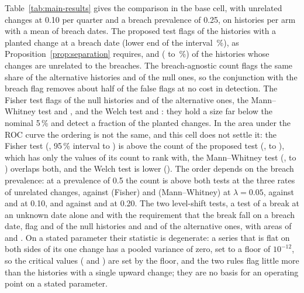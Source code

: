 Table~\ref{tab:main-results} gives the comparison in the base cell, with unrelated changes at 0.10 per quarter and a breach prevalence of 0.25, on \statedN{} histories per arm with a mean of \statedMeanM{} breach dates. The proposed test flags \statedAltEngine{} of the histories with a planted change at a breach date (lower end of the interval \statedAltLoEngine{}\,\%), as Proposition~\ref{prop:separation} requires, and \statedNullEngine{} (\statedNullLoEngine{} to \statedNullHiEngine{}\,\%) of the histories whose changes are unrelated to the breaches. The breach-agnostic count flags the same share of the alternative histories and \statedNullAny{} of the null ones, so the conjunction with the breach flag removes about half of the false flags at no cost in detection. The Fisher test flags \statedNullFisher{} of the null histories and \statedAltFisher{} of the alternative ones, the Mann--Whitney test \statedNullMw{} and \statedAltMw{}, and the Welch test \statedNullWelch{} and \statedAltWelch{}: they hold a size far below the nominal 5\,\% and detect a fraction of the planted changes. In the area under the ROC curve the ordering is not the same, and this cell does not settle it: the Fisher test (\statedAucFisher{}, 95\,\% interval \statedAucLoFisher{} to \statedAucHiFisher{}) is above the count of the proposed test (\statedAucEngine{}, \statedAucLoEngine{} to \statedAucHiEngine{}), which has only the values of its count to rank with, the Mann--Whitney test (\statedAucMw{}, \statedAucLoMw{} to \statedAucHiMw{}) overlaps both, and the Welch test is lower (\statedAucWelch{}). The order depends on the breach prevalence: at a prevalence of 0.5 the count is above both tests at the three rates of unrelated changes, \halfAucAEngine{} against \halfAucAFisher{} (Fisher) and \halfAucAMw{} (Mann--Whitney) at $\lambda=0.05$, \halfAucBEngine{} against \halfAucBFisher{} and \halfAucBMw{} at 0.10, and \halfAucCEngine{} against \halfAucCFisher{} and \halfAucCMw{} at 0.20. The two level-shift tests, a test of a break at an unknown date alone and with the requirement that the break fall on a breach date, flag \statedNullShift{} and \statedNullShiftB{} of the null histories and \statedAltShift{} and \statedAltShiftB{} of the alternative ones, with areas of \statedAucShift{} and \statedAucShiftB{}. On a stated parameter their statistic is degenerate: a series that is flat on both sides of its one change has a pooled variance of zero, set to a floor of $10^{-12}$, so the critical values (\statedShiftDelta{} and \statedShiftBDelta{}) are set by the floor, and the two rules flag little more than the histories with a single upward change; they are no basis for an operating point on a stated parameter.

